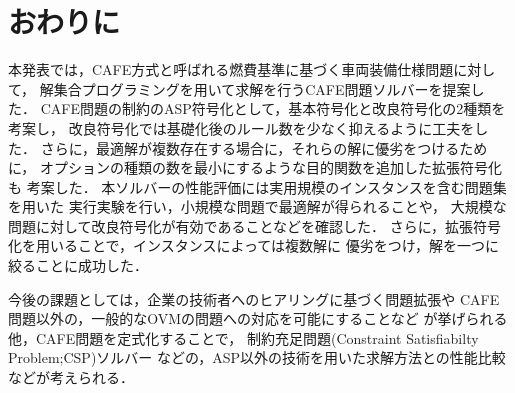 \section{おわりに}

本発表では，CAFE方式と呼ばれる燃費基準に基づく車両装備仕様問題に対して，
解集合プログラミングを用いて求解を行うCAFE問題ソルバーを提案した．
CAFE問題の制約のASP符号化として，基本符号化と改良符号化の2種類を考案し，
改良符号化では基礎化後のルール数を少なく抑えるように工夫をした．
さらに，最適解が複数存在する場合に，それらの解に優劣をつけるために，
オプションの種類の数を最小にするような目的関数を追加した拡張符号化も
考案した．
本ソルバーの性能評価には実用規模のインスタンスを含む問題集を用いた
実行実験を行い，小規模な問題で最適解が得られることや，
大規模な問題に対して改良符号化が有効であることなどを確認した．
さらに，拡張符号化を用いることで，インスタンスによっては複数解に
優劣をつけ，解を一つに絞ることに成功した．

今後の課題としては，企業の技術者へのヒアリングに基づく問題拡張や
CAFE問題以外の，一般的なOVMの問題への対応を可能にすることなど
が挙げられる他，CAFE問題を定式化することで，
制約充足問題(Constraint Satisfiabilty Problem;CSP)ソルバー
などの，ASP以外の技術を用いた求解方法との性能比較などが考えられる．
